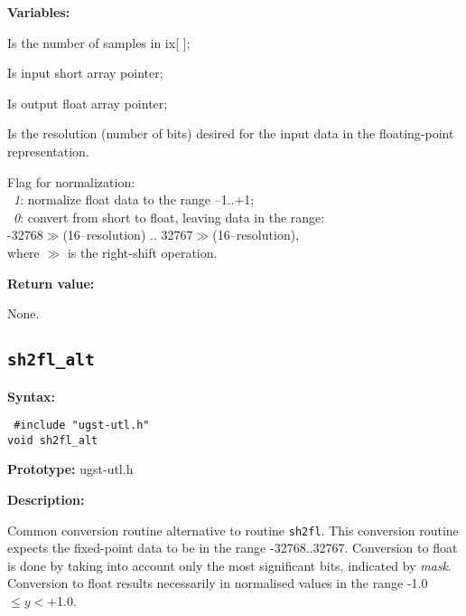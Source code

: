 {\bf Variables: }
\begin{Descr}{\DescrLen}
 \item[\pbox{20mm}{\em n}] %
                     Is the number of samples in ix[ ];
 \item[\pbox{20mm}{\em ix}] %
                     Is input short array pointer;
 \item[\pbox{20mm}{\em y}] %
                     Is output float array pointer;
 \item[\pbox{20mm}{\em resolution}] %
                      Is the resolution (number of bits) desired
                      for the input data in the floating-point
                      representation.
 \item[\pbox{20mm}{\em norm}] %
                      Flag for normalization: \\
                      \ {\em 1}: normalize float data to
                      the range --1..+1; \\
                      \ {\em 0}: convert from short to float,
                      leaving data in the range:\\
                        -32768$\gg$(16--resolution) ..
                           32767$\gg$(16--resolution),\\
                      where $\gg$ is the right-shift operation.
\end{Descr}

{\bf Return value: }

None.


\subsection{{\tt sh2fl\_alt}}

{\bf Syntax: }

{\tt
\#include "ugst-utl.h"\\
void sh2fl\_alt
}

{\bf Prototype: }    ugst-utl.h

{\bf Description: }

Common conversion routine alternative to routine {\tt sh2fl}.  This
conversion routine expects the fixed-point data to be in the range
-32768..32767. Conversion to float is done by taking into account only
the most significant bits, indicated by {\em mask}.  Conversion to
float results necessarily in normalised values in the range -1.0 $\le
y < $+1.0.


